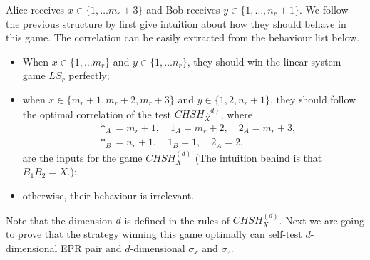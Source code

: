 \documentclass[11pt,letterpaper]{article}
\newcommand{\1}{\mathbb{1}}
\newcommand{\CHSH}{CHSH^{(d)}}
\theoremstyle{definition}
\begin{document}
Alice receives $x \in \{1,\dots m_r+3 \}$ and Bob receives
$y \in \{1,\dots,n_r+1\}$. We follow the previous structure by first give intuition about how they should
behave in this game. The correlation can be easily extracted from the behaviour list below.
\begin{itemize}
	\item When $x \in \{1,\dots m_r\}$ and $y \in \{1, \dots n_r\}$, they should win the 
	linear system game $LS_r$ perfectly;
	\item when $x \in \{m_r+1, m_r+2, m_r+3\}$ and $y \in \{1, 2, n_r+1\}$, they should follow the
	optimal correlation of the test $\CHSH_X$, where 
	\begin{align}
		&\ast_A = m_r+1, \quad 1_A = m_r+2,\quad 2_A = m_r+3,\\
		&\ast_B = n_r+1,\quad 1_B = 1, \quad 2_A = 2,
	\end{align}
	are the inputs for the game $\CHSH_X$
	(The intuition behind is that $B_1B_2 = X$.);
	\item otherwise, their behaviour is irrelevant.
\end{itemize}
Note that the dimension $d$ is defined in the rules of $\CHSH_X$.
Next we are going to prove that the strategy winning this game optimally can self-test $d$-dimensional EPR pair and 
$d$-dimensional $\sigma_x$ and $\sigma_z$.
\end{document}
